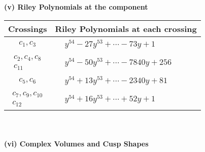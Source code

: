 \documentclass[1p]{elsarticle_modified}
\theoremstyle{definition}
\begin{document}
\newpage\renewcommand{\arraystretch}{1}
\flushleft \textbf{(v) Riley Polynomials at the component}\newline \\
\begin{tabular}{m{50pt}|m{274pt}}
Crossings & \hspace{64pt}Riley Polynomials at each crossing \\
\hline $$\begin{aligned}c_{1},c_{3}\end{aligned}$$&$\begin{aligned}
&y^{54}-27 y^{53}+\cdots-73 y+1
\end{aligned}$\\
\hline $$\begin{aligned}c_{2},c_{4},c_{8}\\c_{11}\end{aligned}$$&$\begin{aligned}
&y^{54}-50 y^{53}+\cdots-7840 y+256
\end{aligned}$\\
\hline $$\begin{aligned}c_{5},c_{6}\end{aligned}$$&$\begin{aligned}
&y^{54}+13 y^{53}+\cdots-2340 y+81
\end{aligned}$\\
\hline $$\begin{aligned}c_{7},c_{9},c_{10}\\c_{12}\end{aligned}$$&$\begin{aligned}
&y^{54}+16 y^{53}+\cdots+52 y+1
\end{aligned}$\\
\hline
\end{tabular}\\~\\
\newpage\flushleft \textbf{(vi) Complex Volumes and Cusp Shapes}
\end{document}
